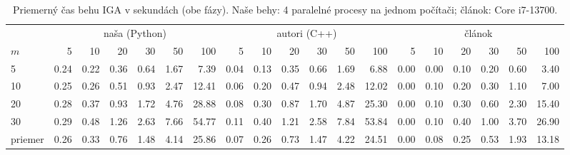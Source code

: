 \begin{table}[ht]
\centering
\scriptsize
\setlength{\tabcolsep}{3pt}
\caption{Priemerný čas behu IGA v sekundách (obe fázy). Naše behy: 4 paralelné procesy na jednom počítači; článok: Core i7-13700.}
\label{tab:time}
\begin{tabular}{l|rrrrrr|rrrrrr|rrrrrr}
\toprule
 & \multicolumn{6}{c}{naša (Python)} & \multicolumn{6}{c}{autori (C++)} & \multicolumn{6}{c}{článok} \\
$m$ & 5 & 10 & 20 & 30 & 50 & 100 & 5 & 10 & 20 & 30 & 50 & 100 & 5 & 10 & 20 & 30 & 50 & 100 \\
\midrule
5 & 0.24 & 0.22 & 0.36 & 0.64 & 1.67 & 7.39 & 0.04 & 0.13 & 0.35 & 0.66 & 1.69 & 6.88 & 0.00 & 0.00 & 0.10 & 0.20 & 0.60 & 3.40 \\
10 & 0.25 & 0.26 & 0.51 & 0.93 & 2.47 & 12.41 & 0.06 & 0.20 & 0.47 & 0.94 & 2.48 & 12.02 & 0.00 & 0.10 & 0.20 & 0.30 & 1.10 & 7.00 \\
20 & 0.28 & 0.37 & 0.93 & 1.72 & 4.76 & 28.88 & 0.08 & 0.30 & 0.87 & 1.70 & 4.87 & 25.30 & 0.00 & 0.10 & 0.30 & 0.60 & 2.30 & 15.40 \\
30 & 0.29 & 0.48 & 1.26 & 2.63 & 7.66 & 54.77 & 0.11 & 0.40 & 1.21 & 2.58 & 7.84 & 53.84 & 0.00 & 0.10 & 0.40 & 1.00 & 3.70 & 26.90 \\
\midrule
priemer & 0.26 & 0.33 & 0.76 & 1.48 & 4.14 & 25.86 & 0.07 & 0.26 & 0.73 & 1.47 & 4.22 & 24.51 & 0.00 & 0.08 & 0.25 & 0.53 & 1.93 & 13.18 \\
\bottomrule
\end{tabular}
\end{table}
